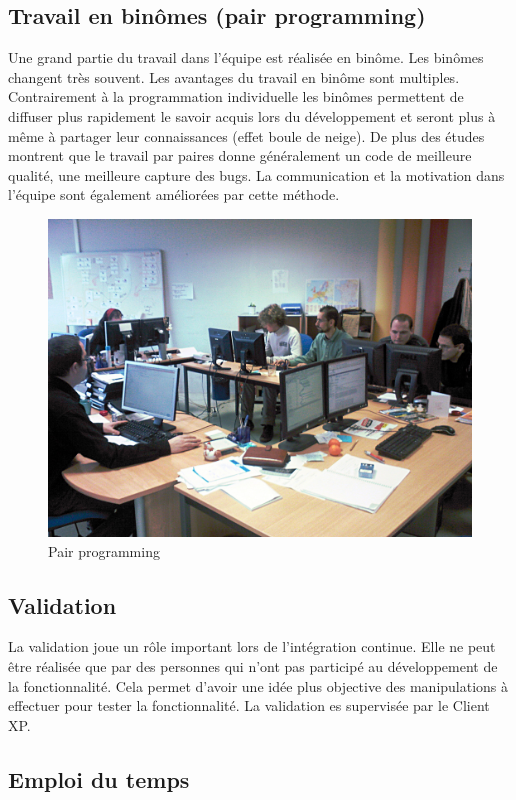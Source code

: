 \subsection{Travail en binômes (pair programming)}
Une grand partie du travail dans l'équipe est réalisée en binôme. Les binômes changent très souvent. Les avantages du travail en binôme sont multiples. Contrairement à la programmation individuelle les binômes permettent de diffuser plus rapidement le savoir acquis lors du développement et seront plus à même à partager leur connaissances (effet boule de neige). De plus des études montrent que le travail par paires donne généralement un code de meilleure qualité, une meilleure capture des bugs. La communication et la motivation dans l'équipe sont également améliorées par cette méthode.
\begin{figure}[!h]
\centering
\includegraphics[scale=0.15]{Illustrations/SP_A0188.jpg}
\caption{Pair programming}
\label{fig:Pair programming}
\end{figure}
\subsection{Validation}
La validation joue un rôle important lors de l'intégration continue. Elle ne peut être réalisée que par des personnes qui n'ont pas participé au développement de la fonctionnalité. Cela permet d'avoir une idée plus objective des manipulations à effectuer pour tester la fonctionnalité. La validation es supervisée par le Client XP.


\subsection{Emploi du temps}

